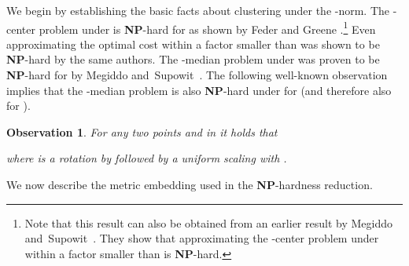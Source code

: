 \documentclass[11pt, letter]{article}
\newtheorem{observation}[theorem]{Observation}
\newcommand{\NP}{\textbf{NP}} \newcommand{\spine}{\textsl{spine}}
\begin{document}
We begin by establishing the basic facts about clustering under the 
-norm.
The -center problem under  is \NP-hard for  as shown
by Feder and Greene \cite{feder1988optimal}.\footnote{Note that this result can
also be obtained from an earlier result by Megiddo
and~Supowit~\cite{megiddo1984geo}. They show that approximating the -center
problem under  within a factor smaller than  is \NP-hard.}
Even approximating the optimal cost within a factor smaller than  was
shown to be \NP-hard by the same authors.
The -median problem under  was proven to be \NP-hard  for  by Megiddo
and~Supowit~\cite{megiddo1984geo}. The following well-known observation implies
that the -median problem is also \NP-hard under  for  (and
therefore also for ). 

\begin{observation}
For any two points  and  in  it holds that 

where  is a rotation by  followed by a uniform scaling with
.
\end{observation}


We now describe the metric embedding used in the \textbf{NP}-hardness reduction.
\end{document}
